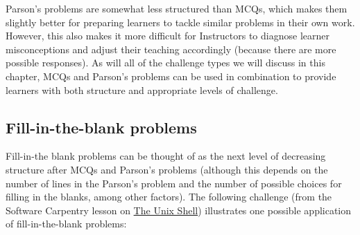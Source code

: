 \documentclass[
]{book}
\begin{document}
Parson's problems are somewhat less structured than MCQs, which makes them slightly
better for preparing learners to tackle similar problems in their own work. However, this also
makes it more difficult for Instructors to diagnose learner misconceptions and adjust their
teaching accordingly (because there are more possible responses). As will all of the challenge
types we will discuss in this chapter, MCQs and Parson's problems can be used in combination
to provide learners with both structure and appropriate levels of challenge.

\hypertarget{fill-in-the-blank-problems}{%
\subsection{Fill-in-the-blank problems}\label{fill-in-the-blank-problems}}

Fill-in-the blank problems can be thought of as the next level of decreasing structure after
MCQs and Parson's problems (although this depends on the number of lines in the Parson's
problem and the number of possible choices for filling in the blanks, among other factors).
The following challenge (from the Software Carpentry lesson on
\href{http://swcarpentry.github.io/shell-novice/}{The Unix Shell}) illustrates one possible
application of fill-in-the-blank problems:
\end{document}
